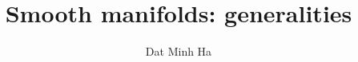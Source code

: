 

\setcounter{section}{-1}





    \title{Smooth manifolds: generalities}
    
    \author{Dat Minh Ha}
    \maketitle
    
    \begin{abstract}
        
    \end{abstract}
    
    {
      \hypersetup{} 
      \tableofcontents %
    }
    
    

    

\printbibliography

